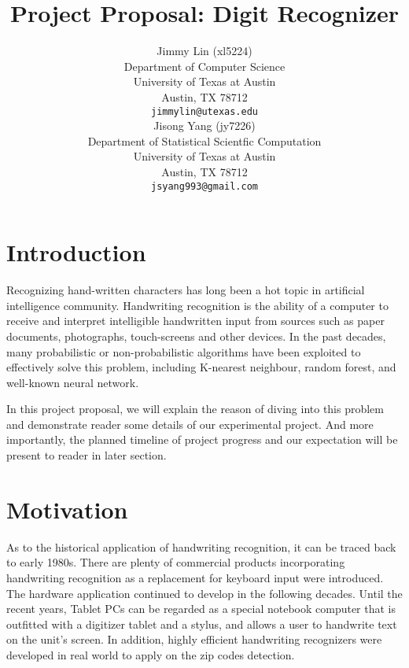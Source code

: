 \documentclass{article} %
\title{Project Proposal: Digit Recognizer}
\author{
Jimmy Lin (xl5224) \\
Department of Computer Science\\
University of Texas at Austin\\
Austin, TX 78712 \\
\texttt{jimmylin@utexas.edu} \\
\And
Jisong Yang (jy7226) \\
Department of Statistical Scientfic Computation\\
University of Texas at Austin\\
Austin, TX 78712 \\
\texttt{jsyang993@gmail.com} \\
}
\begin{document}
\maketitle

%    


\section{Introduction}
Recognizing hand-written characters has long been a hot topic in artificial
intelligence community. 
Handwriting recognition is the ability of a computer to receive and
interpret intelligible handwritten input from sources such as paper documents,
photographs, touch-screens and other devices.
In the past decades, many probabilistic or non-probabilistic algorithms have been exploited to
effectively solve this problem, including K-nearest neighbour,
random forest, and well-known neural network. 

In this project proposal, we will explain the reason of diving into this
problem and demonstrate reader some details of our experimental project.
And more importantly, the planned timeline of project progress and our
expectation will be present to reader in later section.

\section{Motivation}

As to the historical application of handwriting recognition, 
it can be traced back to early 1980s.  There are plenty of commercial products
incorporating handwriting recognition as a replacement for keyboard input were
introduced. The hardware application continued to develop
in the following decades.  Until the recent years, Tablet PCs can be regarded
as a special notebook computer that is outfitted with a digitizer tablet and a
stylus, and allows a user to handwrite text on the unit's screen. In addition,
highly efficient handwriting recognizers were developed in real world to apply
on the zip codes detection.
\end{document}
